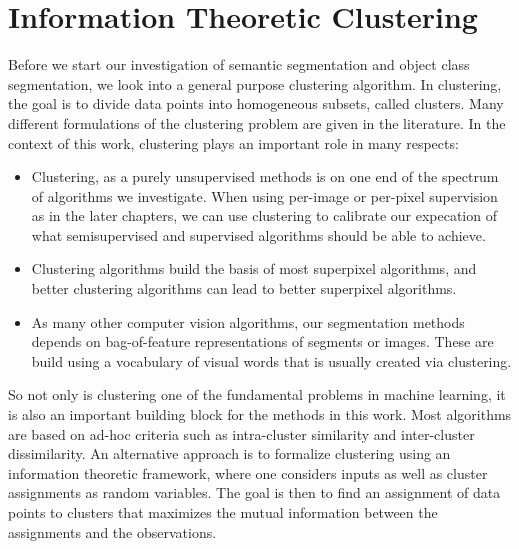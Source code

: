 \chapter{Information Theoretic Clustering}\label{ch:itm}

Before we start our investigation of semantic segmentation and object class segmentation,
we look into a general purpose clustering algorithm.
%
In clustering, the goal is to divide data points into homogeneous subsets, called
clusters.
Many different formulations of the clustering problem are given in the literature.
%
In the context of this work, clustering plays an important role in many respects:
\begin{itemize}
    \item Clustering, as a purely unsupervised methods is on one end of the
        spectrum of algorithms we investigate.  When using per-image or
        per-pixel supervision as in the later chapters, we can use clustering
        to calibrate our expecation of what semisupervised and supervised
        algorithms should be able to achieve.

    \item Clustering algorithms build the basis of most superpixel algorithms, and
        better clustering algorithms can lead to better superpixel algorithms.

    \item As many other computer vision algorithms, our segmentation methods
        depends on bag-of-feature representations of segments or images. These
        are build using a vocabulary of visual words that is usually created
        via clustering.
\end{itemize}

So not only is clustering one of the fundamental problems in machine learning, it is also
an important building block for the methods in this work.
%
Most algorithms are based on ad-hoc criteria such as intra-cluster similarity
and inter-cluster dissimilarity.
An alternative approach is to formalize clustering using an information
theoretic framework, where one considers inputs as well as cluster assignments
as random variables.  The goal is then to find an assignment of data points to
clusters that maximizes the mutual information between the assignments and the
observations.

